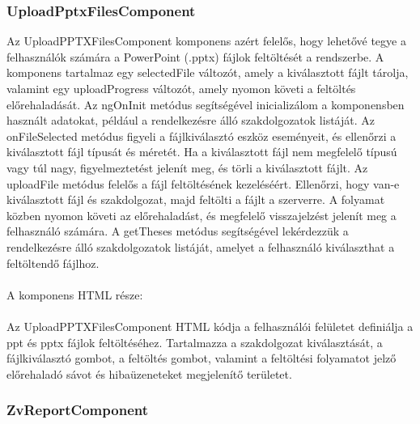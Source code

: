 \subsubsection{UploadPptxFilesComponent}

Az UploadPPTXFilesComponent komponens azért felelős, hogy lehetővé tegye a felhasználók számára a PowerPoint (.pptx) fájlok feltöltését a rendszerbe. A komponens tartalmaz egy selectedFile változót, amely a kiválasztott fájlt tárolja, valamint egy uploadProgress változót, amely nyomon követi a feltöltés előrehaladását. Az ngOnInit metódus segítségével inicializálom a komponensben használt adatokat, például a rendelkezésre álló szakdolgozatok listáját. Az onFileSelected metódus figyeli a fájlkiválasztó eszköz eseményeit, és ellenőrzi a kiválasztott fájl típusát és méretét. Ha a kiválasztott fájl nem megfelelő típusú vagy túl nagy, figyelmeztetést jelenít meg, és törli a kiválasztott fájlt. Az uploadFile metódus felelős a fájl feltöltésének kezeléséért. Ellenőrzi, hogy van-e kiválasztott fájl és szakdolgozat, majd feltölti a fájlt a szerverre. A folyamat közben nyomon követi az előrehaladást, és megfelelő visszajelzést jelenít meg a felhasználó számára. A getTheses metódus segítségével lekérdezzük a rendelkezésre álló szakdolgozatok listáját, amelyet a felhasználó kiválaszthat a feltöltendő fájlhoz.
\\
\\
A komponens HTML része:\\
\\
Az UploadPPTXFilesComponent HTML kódja a felhasználói felületet definiálja a ppt és pptx fájlok feltöltéséhez. Tartalmazza a szakdolgozat kiválasztását, a fájlkiválasztó gombot, a feltöltés gombot, valamint a feltöltési folyamatot jelző előrehaladó sávot és hibaüzeneteket megjelenítő területet.


\subsubsection{ZvReportComponent}

